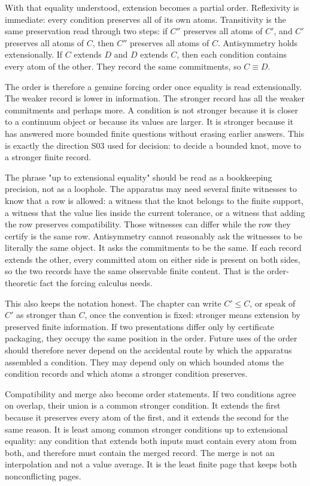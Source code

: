 With that equality understood, extension becomes a partial order. Reflexivity
is immediate: every condition preserves all of its own atoms. Transitivity is
the same preservation read through two steps: if \(C''\) preserves all atoms of
\(C'\), and \(C'\) preserves all atoms of \(C\), then \(C''\) preserves all
atoms of \(C\). Antisymmetry holds extensionally. If \(C\) extends \(D\) and
\(D\) extends \(C\), then each condition contains every atom of the other. They
record the same commitments, so \(C \equiv D\).

The order is therefore a genuine forcing order once equality is read
extensionally. The weaker record is lower in information. The stronger record
has all the weaker commitments and perhaps more. A condition is not stronger
because it is closer to a continuum object or because its values are larger. It
is stronger because it has answered more bounded finite questions without
erasing earlier answers. This is exactly the direction S03 used for decision:
to decide a bounded knot, move to a stronger finite record.

The phrase "up to extensional equality" should be read as a bookkeeping
precision, not as a loophole. The apparatus may need several finite witnesses
to know that a row is allowed: a witness that the knot belongs to the finite
support, a witness that the value lies inside the current tolerance, or a
witness that adding the row preserves compatibility. Those witnesses can differ
while the row they certify is the same row. Antisymmetry cannot reasonably ask
the witnesses to be literally the same object. It asks the commitments to be
the same. If each record extends the other, every committed atom on either side
is present on both sides, so the two records have the same observable finite
content. That is the order-theoretic fact the forcing calculus needs.

This also keeps the notation honest. The chapter can write \(C' \leq C\), or
speak of \(C'\) as stronger than \(C\), once the convention is fixed: stronger
means extension by preserved finite information. If two presentations differ
only by certificate packaging, they occupy the same position in the order.
Future uses of the order should therefore never depend on the accidental route
by which the apparatus assembled a condition. They may depend only on which
bounded atoms the condition records and which atoms a stronger condition
preserves.

Compatibility and merge also become order statements. If two conditions agree
on overlap, their union is a common stronger condition. It extends the first
because it preserves every atom of the first, and it extends the second for the
same reason. It is least among common stronger conditions up to extensional
equality: any condition that extends both inputs must contain every atom from
both, and therefore must contain the merged record. The merge is not an
interpolation and not a value average. It is the least finite page that keeps
both nonconflicting pages.

